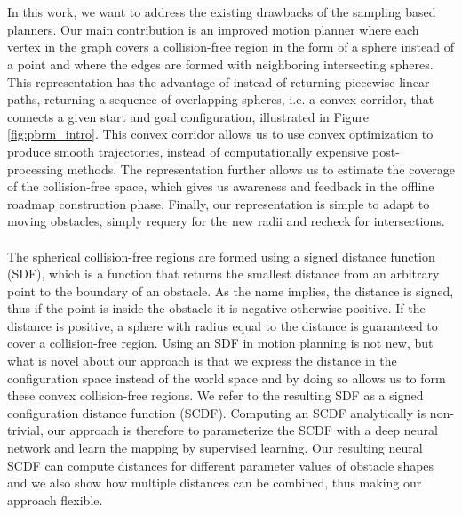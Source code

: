 \documentclass[../main.tex]{subfiles}
\begin{document}
\\\\
In this work, we want to address the existing drawbacks of the sampling based planners. Our main contribution is an improved motion planner where each vertex in the graph covers a collision-free region in the form of a sphere instead of a point and where the edges are formed with neighboring intersecting spheres. This representation has the advantage of instead of returning piecewise linear paths, returning a sequence of overlapping spheres, i.e. a convex corridor, that connects a given start and goal configuration, illustrated in Figure \ref{fig:pbrm_intro}. This convex corridor allows us to use convex optimization to produce smooth trajectories, instead of computationally expensive post-processing methods. The representation further allows us to estimate the coverage of the collision-free space, which gives us awareness and feedback in the offline roadmap construction phase. Finally, our representation is simple to adapt to moving obstacles, simply requery for the new radii and recheck for intersections. 
\\\\
The spherical collision-free regions are formed using a signed distance function (SDF), which is a function that returns the smallest distance from an arbitrary point to the boundary of an obstacle. As the name implies, the distance is signed, thus if the point is inside the obstacle it is negative otherwise positive. If the distance is positive, a sphere with radius equal to the distance is guaranteed to cover a collision-free region. Using an SDF in motion planning is not new, but what is novel about our approach is that we express the distance in the configuration space instead of the world space and by doing so allows us to form these convex collision-free regions. We refer to the resulting SDF as a signed configuration distance function (SCDF). Computing an SCDF analytically is non-trivial, our approach is therefore to parameterize the SCDF with a deep neural network and learn the mapping by supervised learning. Our resulting neural SCDF can compute distances for different parameter values of obstacle shapes and we also show how multiple distances can be combined, thus making our approach flexible.
\end{document}
